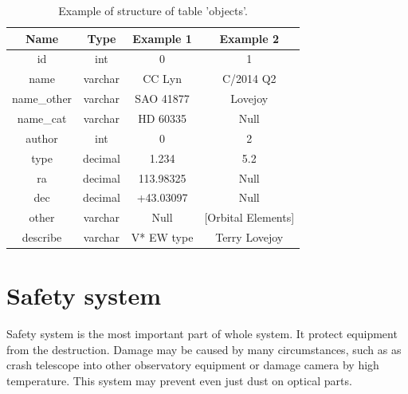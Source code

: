\documentclass{poster16}
\begin{document}
\begin{table}[h]
\begin{center}
{\renewcommand{\arraystretch}{1.8}
\tablefont
\begin{tabular}{|c|c|c|c|}
\hline
Name
&Type
&Example 1
&Example 2\\
\hline
\hline
id
&int
&0
&1\\
\hline
name
&varchar
&CC Lyn
&C/2014 Q2\\
\hline
name\_other
&varchar
&SAO 41877
&Lovejoy\\
\hline
name\_cat
&varchar
&HD 60335
&Null\\
\hline
author
&int
&0
&2\\
\hline
type
&decimal
&1.234
&5.2\\
\hline
ra
&decimal
&113.98325
&Null\\
\hline
dec
&decimal
&+43.03097
&Null\\
\hline
other
&varchar
&Null
&[Orbital Elements]\\
\hline
describe
&varchar
&V* EW type
&Terry Lovejoy\\
\hline
\end{tabular}}
\caption{Example of structure of table 'objects'.}
\label{tab}
\end{center}
\end{table}
\vspace{11cm}

%

\section{Safety system}
Safety system is the most important part of whole system. It protect equipment from the destruction. Damage may be caused by many circumstances, such as as crash telescope into other observatory equipment or damage camera by high temperature. This system may prevent even just dust on optical parts. 
\end{document}
